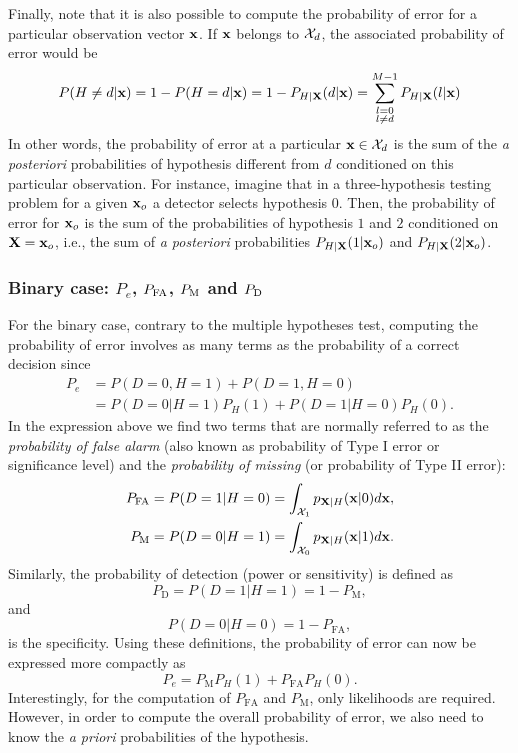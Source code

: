 Finally, note that it is also possible to compute the probability of error for a particular observation vector ${\bf x}$. If ${\bf x}$ belongs to ${\cal X}_d$, the associated probability of error would be
\begin{equation}
    P(H\neq d|{\bf x}) = 1 - P( H = d|{\bf x}) = 1 - P_{H|{\bf X}}(d|{\bf x}) = \sum_{\substack{l = 0 \\ l \neq d}}^{M-1} P_{H|{\bf X}}(l|{\bf x})
    \label{eq:Pe_x}
\end{equation}
In other words, the probability of error at a particular ${\bf x} \in {\cal X}_d$ is the sum of the {\em a posteriori} probabilities of hypothesis different from $d$ conditioned on this particular observation. For instance, imagine that in a three-hypothesis testing problem for a given ${\bf x}_o$ a detector selects hypothesis $0$. Then, the probability of error for  ${\bf x}_o$ is the sum of the probabilities of hypothesis $1$ and $2$ conditioned on ${\bf X} = {\bf x}_o$, i.e., the sum of {\em a posteriori} probabilities $P_{H|{\bf X}}(1|{\bf x}_o)$ and $P_{H|{\bf X}}(2|{\bf x}_o)$.

\subsubsection{Binary case: $P_e$, $P_{\text{FA}}$, $P_{\text{M}}$ and $P_{\text{D}}$}
For the binary case, contrary to the multiple hypotheses test, computing the probability of error  involves as many terms as the probability of a correct decision since
\begin{align}
    P_e & = P(D=0, H=1) + P(D=1, H=0) \nonumber \\
    & = P(D=0|H=1) P_H(1) + P(D=1|H=0) P_H(0). \nonumber
\end{align}
In the expression above we find two terms that are normally referred to as the {\em probability of false alarm} (also known as probability of Type I error or significance level) and the {\em probability of missing} (or probability of Type II error):
\begin{align}
    P_{\text{FA}}  & = P(D=1|H=0) = \int_{{\cal X}_1} p_{{\bf X}|H}({\bf x}|0) d{\bf x}, \nonumber \\
    P_{\text{M}} & = P(D=0|H=1) = \int_{{\cal X}_0} p_{{\bf X}|H}({\bf x}|1) d{\bf x}. \nonumber
\end{align}
Similarly, the probability of detection (power or sensitivity) is defined as
$$P_\text{D} = P(D=1|H=1) = 1 - P_\text{M},$$
and
$$P(D=0|H=0) = 1 - P_\text{FA},$$
is the specificity. Using these definitions, the probability of error can now be expressed more compactly as
$$P_e = P_\text{M} P_H(1) + P_\text{FA} P_H(0).$$
Interestingly, for the computation of $P_\text{FA}$ and $P_\text{M}$, only likelihoods are required. However, in order to compute the overall probability of error, we also need to know the {\em a priori} probabilities of the hypothesis.

